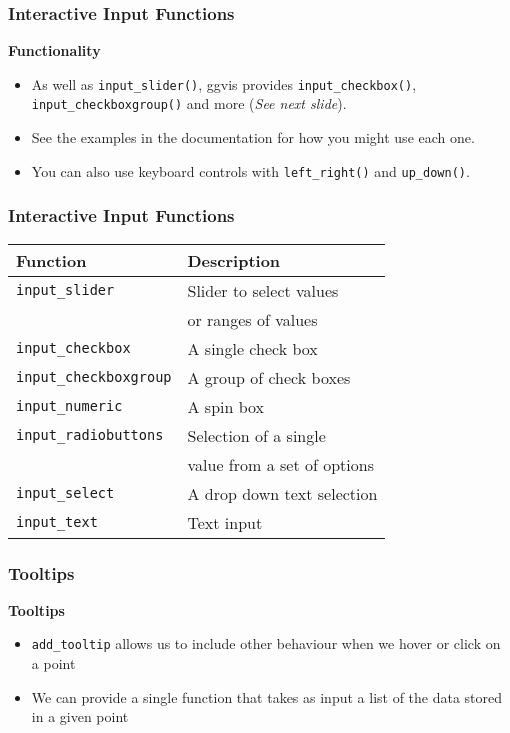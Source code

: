 \documentclass[MASTER.tex]{subfiles}
\begin{document}
 
	\begin{frame}[fragile]
	\frametitle{Interactive Input Functions}
		\Large
		\textbf{Functionality}
		\begin{itemize}
			\item As well as \texttt{input\_slider()}, ggvis provides \texttt{input\_checkbox()}, \texttt{input\_checkboxgroup()} and more  (\textit{See next slide}).
			\item See the examples in the documentation for how you might use each one.
			\item 
			You can also use keyboard controls with \texttt{left\_right()} and \texttt{up\_down()}. 
		\end{itemize}
		
	\end{frame}
\begin{frame}
\frametitle{Interactive Input Functions}
\Large
\begin{tabular}{|l|l|}
	\hline
	\textbf{Function} & \textbf{Description}\\ \hline
	\texttt{input\_slider} & Slider to select values \\  & or ranges of values\\ \hline
	\texttt{input\_checkbox} & A single check box\\ \hline
	\texttt{input\_checkboxgroup} & A group of check boxes \\ \hline
	\texttt{input\_numeric} & A spin box \\ \hline
	\texttt{input\_radiobuttons} & Selection of a single 
	\\
	&  value from a set of options \\ \hline
	\texttt{input\_select }& A drop down text selection \\ \hline
	\texttt{input\_text }& Text input \\ \hline
\end{tabular} 

	
\end{frame}

\begin{frame}
\frametitle{Tooltips}
\Large
\vspace{-1cm}
\textbf{Tooltips}
\begin{itemize}
	\item \texttt{add\_tooltip} allows us to include other behaviour
	when we hover or click on a point
	\item We can provide a single function that takes as
	input a list of the data stored in a given point
	\end{itemize}
\end{frame}
\end{document}
